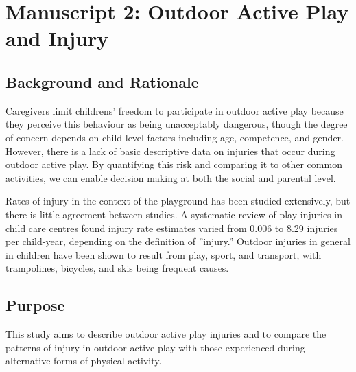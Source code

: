 \documentclass [11pt]{article}
\begin{document}
\section{Manuscript 2: Outdoor Active Play and Injury}
\subsection{Background and Rationale}

Caregivers limit childrens' freedom to participate in outdoor active play because they perceive this behaviour as being unacceptably dangerous, though the degree of concern depends on child-level factors including age, competence, and gender.~\cite{Mitra2014-qg, Lee2015-nz}  However, there is a lack of basic descriptive data on injuries that occur during outdoor active play. By quantifying this risk and comparing it to other common activities, we can enable decision making at both the social and parental level. 

Rates of injury in the context of the playground has been studied extensively, but there is little agreement between studies. A systematic review of play injuries in child care centres found injury rate estimates varied from 0.006 to 8.29 injuries per child-year, depending on the definition of ''injury.'' \cite{Hashikawa2015-nc} Outdoor injuries in general in children have been shown to result from play, sport, and transport, with trampolines, bicycles, and skis being frequent causes.~\cite{Gyllencreutz2015-ng,Klimek2013-er,Eager2013-dt} 

\subsection{Purpose}

This study aims to describe outdoor active play injuries and to compare the patterns of injury in outdoor active play with those experienced during alternative forms of physical activity. 
\end{document}
